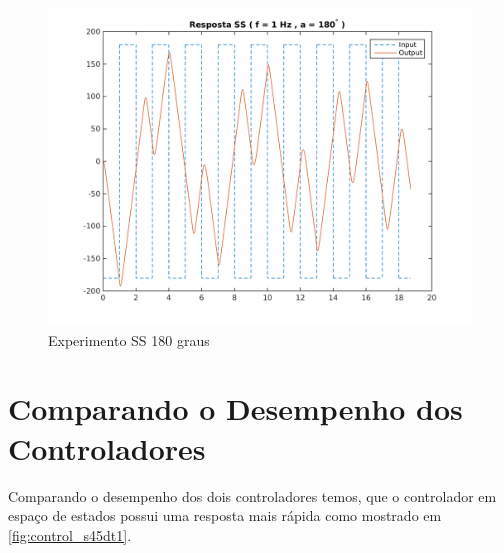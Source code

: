 \documentclass[a4paper,11pt]{article}
\begin{document}
\begin{figure}[H]
    \centering
    \includegraphics[width=0.8\linewidth]{tex/img/quanserss_s180num1.png}
    \caption{Experimento SS 180 graus}
    \label{fig:quanserss_s180num1}
\end{figure}

\section{Comparando o Desempenho dos Controladores}

Comparando o desempenho dos dois controladores temos, que o controlador em espaço de estados possui uma resposta mais rápida como mostrado em \ref{fig:control_s45dt1}.
\end{document}
